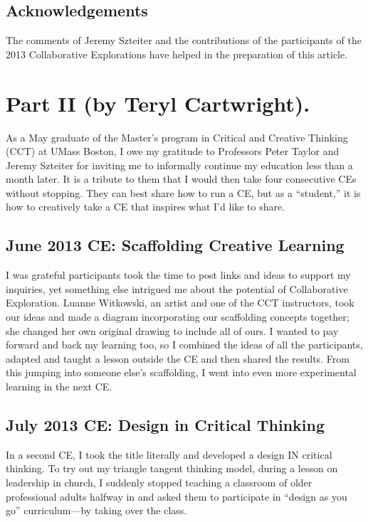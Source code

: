 \subsection{Acknowledgements}

The comments of Jeremy Szteiter and the contributions of the
participants of the 2013 Collaborative Explorations have helped in the
preparation of this article.

\section*{Part II (by Teryl Cartwright).}

As a May graduate of the Master's program in
Critical and Creative Thinking (CCT) at UMass Boston, I owe my gratitude
to Professors Peter Taylor and Jeremy Szteiter for inviting me to
informally continue my education less than a month later. It is a
tribute to them that I would then take four consecutive CEs without
stopping. They can best share how to run a CE, but as a ``student,'' it
is how to creatively take a CE that inspires what I'd like to share.

\subsection{June 2013 CE: Scaffolding Creative Learning}

I was grateful participants took the time to post links and ideas to
support my inquiries, yet something else intrigued me about the
potential of Collaborative Exploration. Luanne Witkowski, an artist and
one of the CCT instructors, took our ideas and made a diagram
incorporating our scaffolding concepts together; she changed her own
original drawing to include all of ours. I wanted to pay forward and
back my learning too, so I combined the ideas of all the participants,
adapted and taught a lesson outside the CE and then shared the results.
From this jumping into someone else's scaffolding, I went into even more
experimental learning in the next CE.

\subsection{July 2013 CE: Design in Critical Thinking}

In a second CE, I took the title literally and developed a design IN
critical thinking. To try out my triangle tangent thinking model, during
a lesson on leadership in church, I suddenly stopped teaching a
classroom of older professional adults halfway in and asked them to
participate in ``design as you go'' curriculum---by taking over the
class. 


